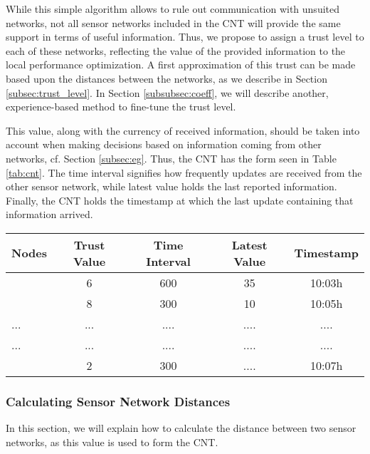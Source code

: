 \documentclass[onecolumn]{jaise2e}
\begin{document}
While this simple algorithm allows to rule out communication with unsuited networks, not all sensor networks included in the CNT will provide the same support in terms of useful information. Thus, we propose to assign a trust level to each of these networks, reflecting the value of the provided information to the local performance optimization. A first approximation of this trust can be made based upon the distances between the networks, as we describe in Section \ref{subsec:trust_level}. In Section \ref{subsubsec:coeff}, we will describe another, experience-based method to fine-tune the trust level. 

This value, along with the currency of received information, should be taken into account when making decisions based on information coming from other networks, cf. Section \ref{subsec:eg}. Thus, the CNT has the form seen in Table \ref{tab:cnt}. The time interval signifies how frequently updates are received from the other sensor network, while latest value holds the last reported information. Finally, the CNT holds the timestamp at which the last update containing that information arrived. 

\begin{table*}[!t]
\centering 
\caption{Cooperating Networks Table}
\begin{tabular}{lcccc}
\hline
Nodes & Trust Value & Time Interval  & Latest Value & Timestamp \\
\hline
	& 6      & 600            & 35                 & 10:03h \\
	& 8      & 300            & 10                  & 10:05h \\
...		& ...      & ....            & ....                 & .... \\ 
...		& ...      & ....            & ....                 & .... \\ 
  & 2      & 300            & ....                 & 10:07h \\
\hline
\end{tabular}
\label{tab:cnt}
\end{table*}
 

\subsubsection{Calculating Sensor Network Distances}\label{subsubsec:network_distance}

In this section, we will explain how to calculate the distance between two sensor networks, as this value is used to form the CNT.
\end{document}
